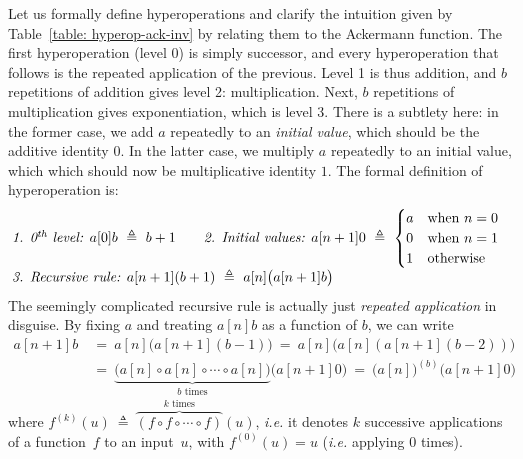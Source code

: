 Let us formally define hyperoperations and clarify the intuition
given by Table~\ref{table: hyperop-ack-inv} by relating them to
the Ackermann function.
The first hyperoperation (level 0) is simply successor, and 
every hyperoperation that follows is the repeated application of the previous.
Level 1 is thus addition, and $b$ repetitions of addition
gives level 2: multiplication. Next, $b$ repetitions of
multiplication gives exponentiation, which is level 3. 
There is a subtlety here: in the former case, we add $a$
repeatedly to an \emph{initial value}, which should be the additive identity $0$.
In the latter case, we multiply $a$ repeatedly to an initial value, which 
which should now be multiplicative identity $1$. The formal definition of hyperoperation is:
\begin{equation}
\label{eq:hyper}
\begin{array}{@{}l@{\qquad}l}
\textit{1. 0$^{\textit{th}}$ level: } a[0]b ~ \triangleq ~ b + 1 &
\textit{2. Initial values: } a[n+1]0 ~ \triangleq ~
  \begin{cases}
    a & \text{when } n = 0 \\
    0 & \text{when } n = 1 \\
    1 & \text{otherwise}
  \end{cases} \\
\multicolumn{2}{@{}l}{\textit{3. Recursive rule: } a[n+1](b+1) ~ \triangleq ~ a[n]\big(a[n+1]b\big)}
\end{array}
\end{equation}
The seemingly complicated recursive rule is actually just \emph{repeated application} in disguise. By fixing $a$ and treating $a[n]b$ as a function of $b$, we can write
\begin{equation*}
\begin{array}{lll}
a[n+1]b ~& = ~ a[n]\big(a[n+1](b-1)\big) ~ = ~ a[n]\big(a[n](a[n+1](b-2))\big) \\
& = ~ \underbrace{\big( a[n]\circ a[n]\circ \cdots \circ a[n] \big)}_{b \text{ times}} \big(a[n+1]0\big)  ~ = ~ \big(a[n]\big)^{(b)}\big(a[n+1]0\big)
\end{array}
\end{equation*}
where $f^{(k)}(u) ~ \triangleq ~ \overbrace{(f\circ f\circ \cdots \circ f)}^{k \text{ times}} (u)$, 
\emph{i.e.} it denotes $k$ successive applications of a function~$f$ to an 
input~$u$, with $f^{(0)}(u) = u$ (\emph{i.e.} applying $0$ times). 

